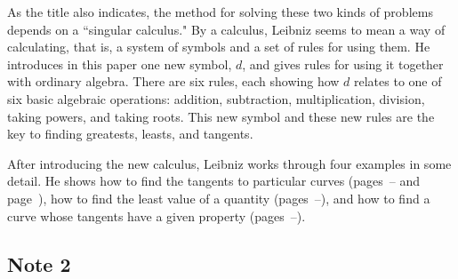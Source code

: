 \documentclass[polutonikogreek,english,twoside,openright]{article}
\begin{document}
As the title also indicates, the method for solving these two kinds of problems depends on a ``singular calculus."   By a calculus, Leibniz seems to mean a way of calculating, that is, a system of symbols and a set of rules for using them.  He introduces in this paper one new symbol, $d$, and gives rules for using it together with ordinary algebra.   There are six rules, each showing how $d$ relates to one of six basic algebraic operations: addition, subtraction, multiplication, division, taking powers, and taking roots.  This new symbol and these new rules are the key to finding greatests, leasts, and tangents.  

After introducing the new calculus, Leibniz works through four examples in some detail.  He shows how to find the tangents to particular curves (pages~\pageref{bnmex1}--\pageref{enmex1} and page~\pageref{begdeb}), how to find the least value of a quantity (pages~\pageref{bnmex2}--\pageref{enmex2}), and how to find a curve whose tangents have a given property (pages~\pageref{bnmex3}--\pageref{enmex3}).


\subsection*{Note 2}
\label{cnm2}
\end{document}

